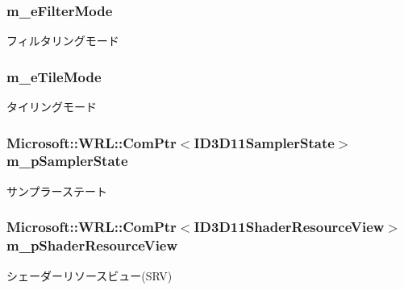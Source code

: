 \subsubsection[{\texorpdfstring{m\+\_\+e\+Filter\+Mode}{m_eFilterMode}}]{ m\+\_\+e\+Filter\+Mode\hspace{0.3cm}{\ttfamily [protected]}}\hypertarget{class_a_p_i_1_1abstract_ac28f3c414d9557e103174d98fb45ac80}{}\label{class_a_p_i_1_1abstract_ac28f3c414d9557e103174d98fb45ac80}
フィルタリングモード 
\subsubsection[{\texorpdfstring{m\+\_\+e\+Tile\+Mode}{m_eTileMode}}]{ m\+\_\+e\+Tile\+Mode\hspace{0.3cm}{\ttfamily [protected]}}\hypertarget{class_a_p_i_1_1abstract_ac3e6155bd6f42e0485e99c91b99a1970}{}\label{class_a_p_i_1_1abstract_ac3e6155bd6f42e0485e99c91b99a1970}
タイリングモード 
\subsubsection[{\texorpdfstring{m\+\_\+p\+Sampler\+State}{m_pSamplerState}}]{\setlength{\rightskip}{0pt plus 5cm}Microsoft\+::\+W\+R\+L\+::\+Com\+Ptr$<$I\+D3\+D11\+Sampler\+State$>$ m\+\_\+p\+Sampler\+State\hspace{0.3cm}{\ttfamily [protected]}}\hypertarget{class_a_p_i_1_1abstract_a94fdba7a2106647566ca2a907c0bd5e7}{}\label{class_a_p_i_1_1abstract_a94fdba7a2106647566ca2a907c0bd5e7}
サンプラーステート 
\subsubsection[{\texorpdfstring{m\+\_\+p\+Shader\+Resource\+View}{m_pShaderResourceView}}]{\setlength{\rightskip}{0pt plus 5cm}Microsoft\+::\+W\+R\+L\+::\+Com\+Ptr$<$I\+D3\+D11\+Shader\+Resource\+View$>$ m\+\_\+p\+Shader\+Resource\+View\hspace{0.3cm}{\ttfamily [protected]}}\hypertarget{class_a_p_i_1_1abstract_a46609e86f9414823aa6403ebbfcef380}{}\label{class_a_p_i_1_1abstract_a46609e86f9414823aa6403ebbfcef380}
シェーダーリソースビュー(\+S\+R\+V) 

